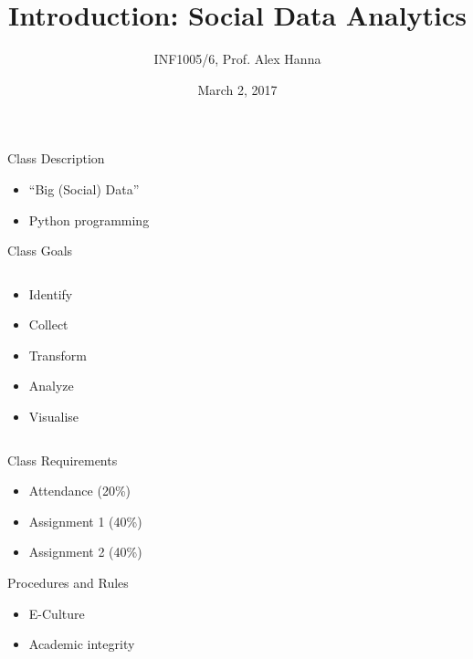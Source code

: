 \documentclass{beamer}
\title[Introduction: Social Data Analytics]
{Introduction: Social Data Analytics}
\author{INF1005/6, Prof. Alex Hanna}
\institute[] {
}
\date[] {
March 2, 2017
}
\begin{document}
\begin{frame}
  \titlepage
\end{frame}

\begin{frame}{Class Description}
    \begin{itemize}
        \item ``Big (Social) Data''
        \item Python programming
    \end{itemize}
\end{frame}

\begin{frame}{Class Goals}
  \begin{columns}
    \begin{column}{0.5\textwidth}
      \begin{itemize}[<+->]
        \item Identify
        \item Collect
        \item Transform
        \item Analyze
        \item Visualise
      \end{itemize}
    \end{column}
    \begin{column}{0.5\textwidth}
    \end{column}
  \end{columns}
\end{frame}

\begin{frame}{Class Requirements}
  \begin{center}
      \begin{itemize}[<+->]
        \item Attendance (20\%)
        \item Assignment 1 (40\%)
        \item Assignment 2 (40\%)
      \end{itemize}
  \end{center}
\end{frame}

\begin{frame}{Procedures and Rules}
    \begin{itemize}[<+->]
        \item E-Culture 
        \item Academic integrity
    \end{itemize}
\end{frame}
\end{document}
